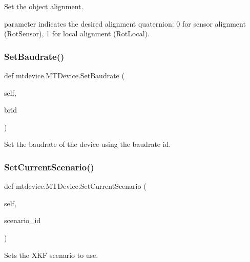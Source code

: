 \begin{DoxyVerb}Set the object alignment.

parameter indicates the desired alignment quaternion:
    0 for sensor alignment (RotSensor),
    1 for local alignment (RotLocal).
\end{DoxyVerb}
 \mbox{\label{classmtdevice_1_1MTDevice_ac964b061548751f4885b12dc01a0a0f7}} 
\subsubsection{\texorpdfstring{Set\+Baudrate()}{SetBaudrate()}}
{\footnotesize\ttfamily def mtdevice.\+M\+T\+Device.\+Set\+Baudrate (\begin{DoxyParamCaption}\item[{}]{self,  }\item[{}]{brid }\end{DoxyParamCaption})}

\begin{DoxyVerb}Set the baudrate of the device using the baudrate id.\end{DoxyVerb}
 \mbox{\label{classmtdevice_1_1MTDevice_a94eaa1bb8de52ed69bb20c9ffa404fe8}} 
\subsubsection{\texorpdfstring{Set\+Current\+Scenario()}{SetCurrentScenario()}}
{\footnotesize\ttfamily def mtdevice.\+M\+T\+Device.\+Set\+Current\+Scenario (\begin{DoxyParamCaption}\item[{}]{self,  }\item[{}]{scenario\+\_\+id }\end{DoxyParamCaption})}

\begin{DoxyVerb}Sets the XKF scenario to use.\end{DoxyVerb}
 \mbox{\label{classmtdevice_1_1MTDevice_a9f8b2a581a49333421f371ea1403b953}} 
